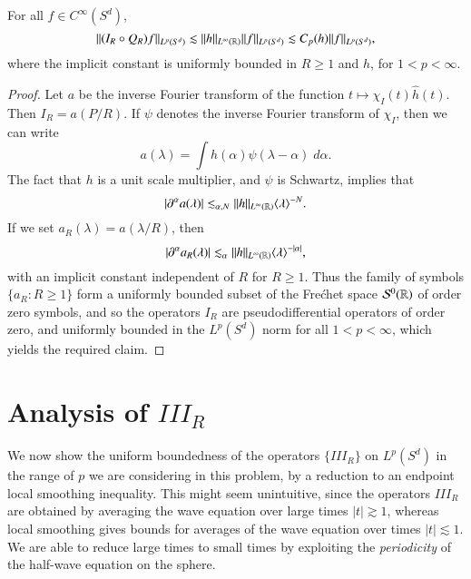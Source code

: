 \begin{lemma} \label{SmallTimeInequalityLemma}
    For all $f \in C^\infty(S^d)$,
    \[ \| (I_R \circ Q_R) f \|_{L^p(S^d)} \lesssim \| h \|_{L^\infty(\operatorname{\mathbb{R}})} \| f \|_{L^p(S^d)} \lesssim C_p(h) \| f \|_{L^p(S^d)}, \] 
    where the implicit constant is uniformly bounded in $R \geq 1$ and $h$, for $1 < p < \infty$.
\end{lemma}
\begin{proof}
    Let $a$ be the inverse Fourier transform of the function $t \mapsto \chi_I(t) \widehat{h}(t)$. Then $I_R = a(P/R)$. If $\psi$ denotes the inverse Fourier transform of $\chi_I$, then we can write
    \[ a(\lambda) = \int h(\alpha) \psi(\lambda - \alpha)\; d\alpha. \]
    The fact that $h$ is a unit scale multiplier, and $\psi$ is Schwartz, implies that
    \[ |\partial^\alpha a(\lambda)| \lesssim_{\alpha,N} \| h \|_{L^\infty(\operatorname{\mathbb{R}})} \langle \lambda \rangle^{-N}. \]
    If we set $a_R(\lambda) = a(\lambda / R)$, then
    \[ |\partial^\alpha a_R(\lambda)| \lesssim_\alpha \| h \|_{L^\infty(\operatorname{\mathbb{R}})} \langle \lambda \rangle^{-|\alpha|}, \]
    with an implicit constant independent of $R$ for $R \geq 1$. Thus the family of symbols $\{ a_R : R \geq 1 \}$ form a uniformly bounded subset of the Fre\'{c}het space $\mathcal{S}^0(\operatorname{\mathbb{R}})$ of order zero symbols, and so the operators $I_R$ are pseudodifferential operators of order zero, and uniformly bounded in the $L^p(S^d)$ norm for all $1 < p < \infty$, which yields the required claim.
\end{proof}

\section{Analysis of $III_R$}

We now show the uniform boundedness of the operators $\{ III_R \}$ on $L^p(S^d)$ in the range of $p$ we are considering in this problem, by a reduction to an endpoint local smoothing inequality. This might seem unintuitive, since the operators $III_R$ are obtained by averaging the wave equation over large times $|t| \gtrsim 1$, whereas local smoothing gives bounds for averages of the wave equation over times $|t| \lesssim 1$. We are able to reduce large times to small times by exploiting the \emph{periodicity} of the half-wave equation on the sphere.

